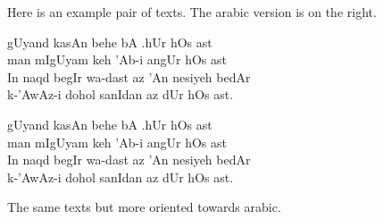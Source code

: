 \documentclass[12pt]{article}
\begin{document}
Here is an example pair of texts. The arabic version is on the right.

\vspace{\baselineskip}

\begin{pairs}

\begin{Leftside}
\beginnumbering
\pstart
\noindent
gUyand kasAn behe  bA .hUr  hOs ast \\
man mIgUyam keh 'Ab-i angUr hOs ast \\
In naqd begIr wa-dast az 'An nesiyeh bedAr \\
k-'AwAz-i dohol sanIdan az dUr hOs ast.
\pend
\end{Leftside}

\renewcommand{\Rlineflag}{r} %
\begin{Rightside}
 
\begin{arabtext}
\beginnumbering
\pstart
\noindent
gUyand kasAn behe  bA .hUr  hOs ast \\
man mIgUyam keh 'Ab-i angUr hOs ast \\
In naqd begIr wa-dast az 'An nesiyeh bedAr \\
k-'AwAz-i dohol sanIdan az dUr hOs ast.
\pend
\end{arabtext}
\end{Rightside}

\Columns

\end{pairs}

\vspace{\baselineskip}

The same texts but more oriented towards arabic.

\vspace{\baselineskip}
\end{document}
